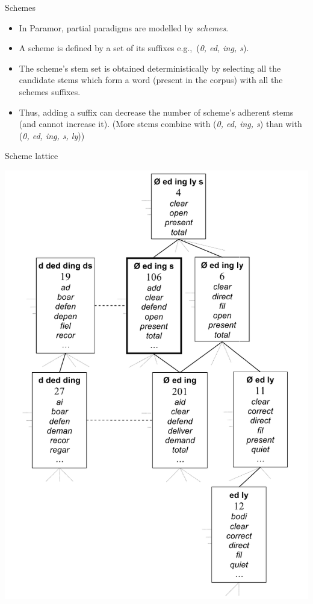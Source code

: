 \documentclass[hyperref={pdfencoding=unicode, unicode=true}]{beamer}
\newcommand{\eg}{e.g.,~}
\begin{document}
\begin{frame}{Schemes}
\begin{itemize}
\item In Paramor, partial paradigms are modelled by \emph{schemes}. 
\item A scheme is defined by a set of its suffixes \eg (\emph{0, ed, ing, s}).
\item The scheme's stem set is obtained deterministically by selecting all the candidate stems which form a word (present in the corpus) with all the schemes suffixes.
\item Thus, adding a suffix can decrease the number of scheme's adherent stems (and cannot increase it). (More stems combine with (\emph{0, ed, ing, s}) than with (\emph{0, ed, ing, s, ly}))
\end{itemize}
\end{frame}

\begin{frame}{Scheme lattice}
\vspace{-8pt}
\begin{center}
\includegraphics[scale=0.25]{schemeLattice.png}
\end{center}

\end{frame}
\end{document}
